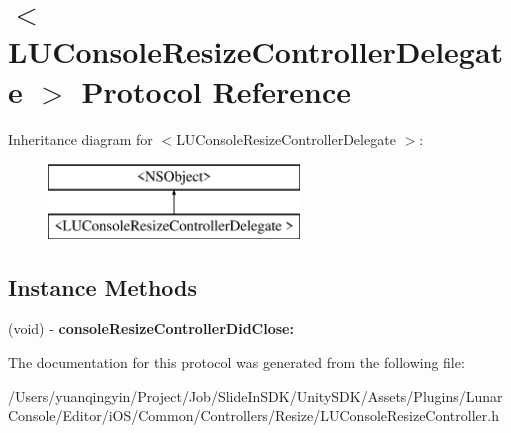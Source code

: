 \hypertarget{protocol_l_u_console_resize_controller_delegate_01-p}{}\section{$<$L\+U\+Console\+Resize\+Controller\+Delegate $>$ Protocol Reference}
\label{protocol_l_u_console_resize_controller_delegate_01-p}
Inheritance diagram for $<$L\+U\+Console\+Resize\+Controller\+Delegate $>$\+:\begin{figure}[H]
\begin{center}
\leavevmode
\includegraphics[height=2.000000cm]{protocol_l_u_console_resize_controller_delegate_01-p}
\end{center}
\end{figure}
\subsection*{Instance Methods}
\begin{DoxyCompactItemize}
\item 
\mbox{\label{protocol_l_u_console_resize_controller_delegate_01-p_acc8ad894de4293b9cb283c6b994931b2}} 
(void) -\/ {\bfseries console\+Resize\+Controller\+Did\+Close\+:}
\end{DoxyCompactItemize}


The documentation for this protocol was generated from the following file\+:\begin{DoxyCompactItemize}
\item 
/\+Users/yuanqingyin/\+Project/\+Job/\+Slide\+In\+S\+D\+K/\+Unity\+S\+D\+K/\+Assets/\+Plugins/\+Lunar\+Console/\+Editor/i\+O\+S/\+Common/\+Controllers/\+Resize/L\+U\+Console\+Resize\+Controller.\+h\end{DoxyCompactItemize}
